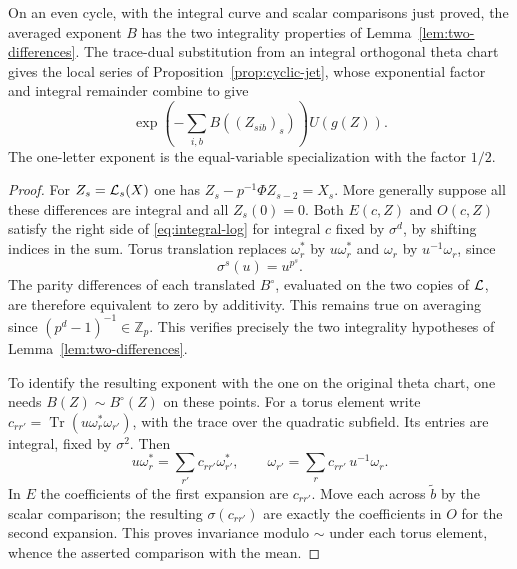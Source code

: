 \begin{proposition}\label{prop:curve-cycle-exponent}
On an even cycle, with the integral curve and scalar comparisons
just proved, the averaged exponent \(B\) has the two integrality
properties of Lemma~\ref{lem:two-differences}. The trace-dual
substitution from an integral orthogonal theta chart gives
the local series of Proposition~\ref{prop:cyclic-jet}, whose exponential factor and integral remainder combine to give
\[
 \exp\!\left(-\sum_{i,b}B((Z_{sib})_s)\right)U(g(Z)).
\]
 The one-letter exponent is the equal-variable
specialization with the factor \(1/2\).
\end{proposition}

\begin{proof}

For \(Z_s={\cal L}_s(X)\) one has
\(Z_s-p^{-1}\Phi Z_{s-2}=X_s\). More generally suppose all
these differences are integral and all \(Z_s(0)=0\). Both
\(E(c,Z)\) and \(O(c,Z)\) satisfy the right side of
\eqref{eq:integral-log} for integral \(c\) fixed by \(\sigma^d\),
by shifting indices in the sum. Torus translation replaces
\(\omega_r^*\) by \(u\omega_r^*\) and \(\omega_r\) by
\(u^{-1}\omega_r\), since 
\[
  \sigma^s(u)=u^{p^s}.
\]
The parity differences of each translated \(B^\circ\), evaluated
on the two copies of \({\cal L}\), are therefore equivalent to
zero by additivity. This remains true on averaging since
\((p^d-1)^{-1}\in\mathbb Z_p\). This verifies precisely the two
integrality hypotheses of Lemma~\ref{lem:two-differences}.


To identify the resulting exponent with the one on the original
theta chart, one needs \(B(Z)\sim B^\circ(Z)\) on these points.
For a torus element write
\(c_{rr'}=\operatorname{Tr}(u\omega_r^*\omega_{r'})\), with
the trace over the quadratic subfield. Its entries are integral,
fixed by \(\sigma^2\). Then
\[
 u\omega_r^*=\sum_{r'}c_{rr'}\omega_{r'}^*,\qquad
 \omega_{r'}=\sum_r c_{rr'}\,u^{-1}\omega_r .
\]
In \(E\) the coefficients of the first expansion are \(c_{rr'}\).
Move each across \(\widetilde b\) by the scalar comparison;
the resulting \(\sigma(c_{rr'})\) are exactly the coefficients
in \(O\) for the second expansion. This proves invariance
modulo \(\sim\) under each torus element, whence the asserted
comparison with the mean.



\end{proof}
